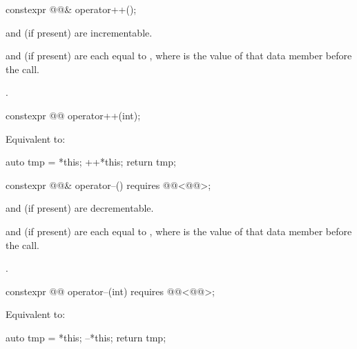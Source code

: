 \begin{itemdecl}
constexpr @@& operator++();
\end{itemdecl}

\begin{itemdescr}
\pnum
\expects
{} and  (if present) are incrementable.

\pnum
\ensures
{} and  (if present) are
each equal to ,
where  is the value of that data member before the call.

\pnum
\returns
{}.
\end{itemdescr}

\begin{itemdecl}
constexpr @@ operator++(int);
\end{itemdecl}

\begin{itemdescr}
\pnum
\effects
Equivalent to:
\begin{codeblock}
auto tmp = *this;
++*this;
return tmp;
\end{codeblock}
\end{itemdescr}

\begin{itemdecl}
constexpr @@& operator--() requires @@<@@>;
\end{itemdecl}

\begin{itemdescr}
\pnum
\expects
{} and  (if present) are decrementable.

\pnum
\ensures
{} and  (if present) are
each equal to ,
where  is the value of that data member before the call.

\pnum
\returns
{}.
\end{itemdescr}

\begin{itemdecl}
constexpr @@ operator--(int) requires @@<@@>;
\end{itemdecl}

\begin{itemdescr}
\pnum
\effects
Equivalent to:
\begin{codeblock}
auto tmp = *this;
--*this;
return tmp;
\end{codeblock}
\end{itemdescr}


